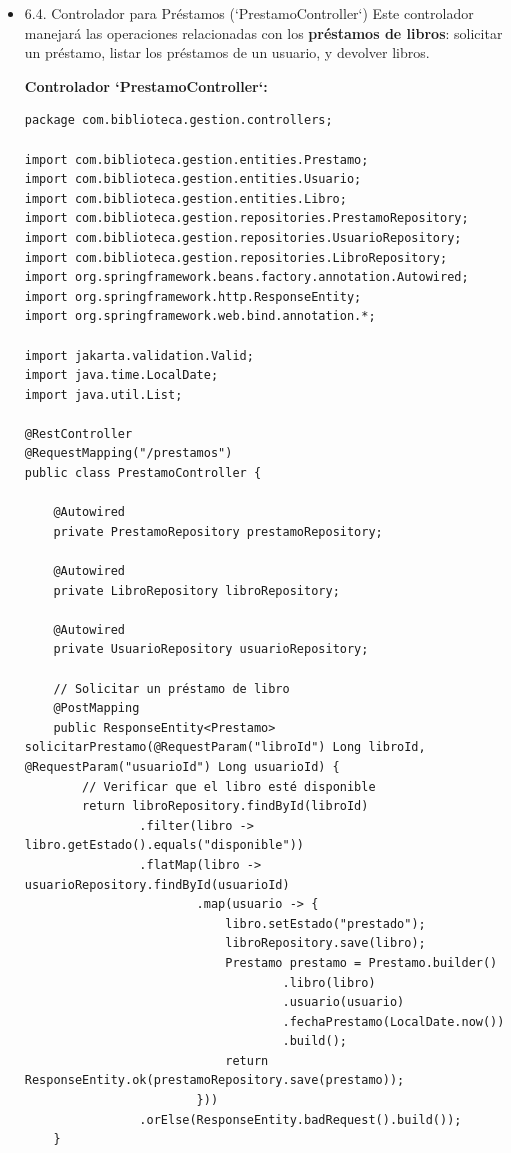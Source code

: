 \documentclass[11pt]{article}
\begin{document}
\begin{itemize}
---

\item 6.4. Controlador para Préstamos (`PrestamoController`)
\label{sec:orgad9011b}
Este controlador manejará las operaciones relacionadas con los \textbf{\textbf{préstamos de libros}}: solicitar un préstamo, listar los préstamos de un usuario, y devolver libros.

\textbf{Controlador `PrestamoController`:}
\begin{verbatim}
package com.biblioteca.gestion.controllers;

import com.biblioteca.gestion.entities.Prestamo;
import com.biblioteca.gestion.entities.Usuario;
import com.biblioteca.gestion.entities.Libro;
import com.biblioteca.gestion.repositories.PrestamoRepository;
import com.biblioteca.gestion.repositories.UsuarioRepository;
import com.biblioteca.gestion.repositories.LibroRepository;
import org.springframework.beans.factory.annotation.Autowired;
import org.springframework.http.ResponseEntity;
import org.springframework.web.bind.annotation.*;

import jakarta.validation.Valid;
import java.time.LocalDate;
import java.util.List;

@RestController
@RequestMapping("/prestamos")
public class PrestamoController {

    @Autowired
    private PrestamoRepository prestamoRepository;

    @Autowired
    private LibroRepository libroRepository;

    @Autowired
    private UsuarioRepository usuarioRepository;

    // Solicitar un préstamo de libro
    @PostMapping
    public ResponseEntity<Prestamo> solicitarPrestamo(@RequestParam("libroId") Long libroId, @RequestParam("usuarioId") Long usuarioId) {
        // Verificar que el libro esté disponible
        return libroRepository.findById(libroId)
                .filter(libro -> libro.getEstado().equals("disponible"))
                .flatMap(libro -> usuarioRepository.findById(usuarioId)
                        .map(usuario -> {
                            libro.setEstado("prestado");
                            libroRepository.save(libro);
                            Prestamo prestamo = Prestamo.builder()
                                    .libro(libro)
                                    .usuario(usuario)
                                    .fechaPrestamo(LocalDate.now())
                                    .build();
                            return ResponseEntity.ok(prestamoRepository.save(prestamo));
                        }))
                .orElse(ResponseEntity.badRequest().build());
    }


\end{verbatim}
\end{itemize}
\end{document}
